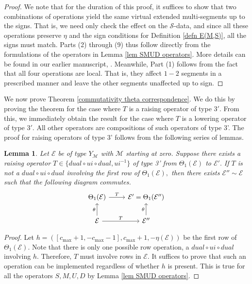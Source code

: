 \documentclass[11pt,letterpaper]{amsart}
\newcommand{\EE}{\mathcal{E}}
\newtheorem{lemma}[thm]{Lemma}
\numberwithin{equation}{section}
\begin{document}
\begin{proof}
    We note that for the duration of this proof, it suffices to show that two combinations of operations yield the same virtual extended multi-segments up to the signs. That is, we need only check the effect on the $\mathcal{S}$-data, and since all these operations preserve $\eta$ and the sign conditions for Definition \ref{defn E(M,S)}, all the signs must match. Parts (2) through (9) thus follow directly from the formulations of the operators in Lemma \ref{lem SMUD operators}. More details can be found in our earlier manuscript, \cite[\S 12]{HKT25}. Meanwhile, Part (1) follows from the fact that all four operations are local. That is, they affect $1-2$ segments in a prescribed manner and leave the other segments unaffected up to sign.
\end{proof}

We now prove Theorem \ref{commutativity theta correspondence}. We do this by proving the theorem for the case where $T$ is a raising operator of type $3'.$ From this, we immediately obtain the result for the case where $T$ is a lowering operator of type $3'.$ All other operators are compositions of such operators of type 3'. The proof for raising operators of type 3' follows from the following series of lemmas.

\begin{lemma}
\label{commute 0 to 1}
    Let $\EE$ be of type $Y_\mathcal{M}$ with $\mathcal{M}$ starting at zero. Suppose there exists a raising operator $T \in \{ dual \circ ui \circ dual, ui^{-1}\}$ of type 3' from $\Theta_1(\EE)$ to $\EE'.$ If $T$ is not a $dual \circ ui \circ dual$ involving the first row of $\Theta_1(\EE),$ then there exists $\EE'' \sim \EE$ such that the following diagram commutes.
\[\begin{tikzcd}
	{\Theta_1(\EE)} & {\EE' = \Theta_1(\EE'')} \\
	{\EE} & {\EE''}
	\arrow["T", from=1-1, to=1-2]
	\arrow["\theta", from=2-1, to=1-1]
	\arrow["T", from=2-1, to=2-2]
	\arrow["\theta", from=2-2, to=1-2]
\end{tikzcd}\]
\end{lemma}

\begin{proof}
    Let $h = ([c_{\max} + 1, -c_{\max} - 1], c_{\max} + 1, -\eta(\EE))$ be the first row of $\Theta_1(\EE).$ Note that there is only one possible row operation, a $dual \circ ui\circ dual$ involving $h.$ Therefore, $T$ must involve rows in $\EE$. 
    It suffices to prove that such an operation can be implemented regardless of whether $h$ is present. This is true for all the operators $S, M, U, D$ by Lemma \ref{lem SMUD operators}.
\end{proof}
\end{document}
